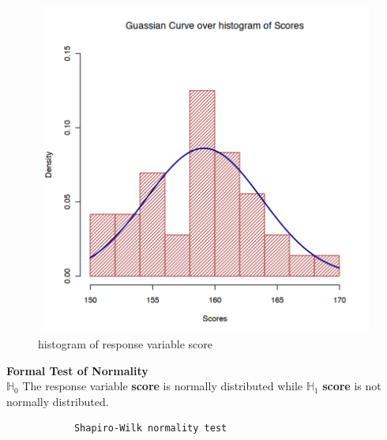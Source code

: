 \documentclass[12pt,a4paper]{article}
\begin{document}
\begin{enumerate}
\begin{figure}[!h]
				\includegraphics[width=370pt,height=310pt]{./graphics/q43b.png}
				\caption{histogram of response variable score}
				\label{fig:04}
		\end{figure}
		
\textbf{Formal Test of Normality}\\
$\mathbb{H}_0 $ The response variable \textbf{score} is normally distributed while  $\mathbb{H}_1$  \textbf{score} is not normally distributed.
\begin{verbatim}
			Shapiro-Wilk normality test
			

\end{verbatim}
\end{enumerate}
\end{document}
